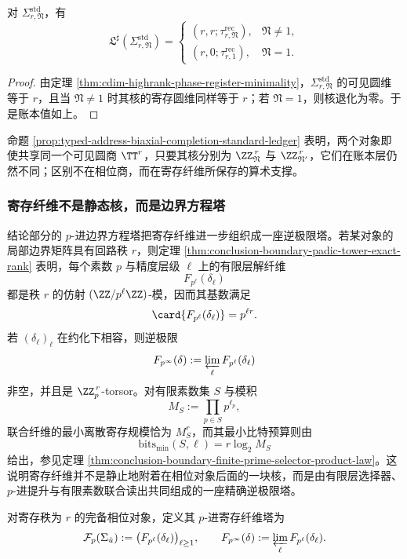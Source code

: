 \begin{proposition}[标准原型的账本值]\label{prop:typed-address-biaxial-completion-standard-ledger}
对 \(\Sigma^{\mathrm{std}}_{r,\mathfrak N}\)，有
\[
\mathfrak L^\sharp(\Sigma^{\mathrm{std}}_{r,\mathfrak N})
=
\begin{cases}
(r,r;\tau^{\mathrm{rec}}_{r,\mathfrak N}), & \mathfrak N\neq 1,\\[4pt]
(r,0;\tau^{\mathrm{rec}}_{r,1}), & \mathfrak N=1.
\end{cases}
\]
\end{proposition}
\begin{proof}
由定理 \ref{thm:cdim-highrank-phase-register-minimality}，\(\Sigma^{\mathrm{std}}_{r,\mathfrak N}\) 的可见圆维等于 \(r\)，且当 \(\mathfrak N\neq 1\) 时其核的寄存圆维同样等于 \(r\)；若 \(\mathfrak N=1\)，则核退化为零。于是账本值如上。
\end{proof}

命题 \ref{prop:typed-address-biaxial-completion-standard-ledger} 表明，两个对象即使共享同一个可见圆商 \(\TT^r\)，只要其核分别为 \(\ZZ_{\mathfrak N}^{\,r}\) 与 \(\ZZ_{\mathfrak N'}^{\,r}\)，它们在账本层仍然不同；区别不在相位商，而在寄存纤维所保存的算术支撑。

\subsubsection{寄存纤维不是静态核，而是边界方程塔}\label{subsubsec:typed-address-biaxial-completion-register-tower}
结论部分的 \(p\)-进边界方程塔把寄存纤维进一步组织成一座逆极限塔。若某对象的局部边界矩阵具有回路秩 \(r\)，则定理 \ref{thm:conclusion-boundary-padic-tower-exact-rank} 表明，每个素数 \(p\) 与精度层级 \(\ell\) 上的有限层解纤维
\[
F_{p^\ell}(\delta_\ell)
\]
都是秩 \(r\) 的仿射 \((\ZZ/p^\ell\ZZ)\)-模，因而其基数满足
\[
\card{F_{p^\ell}(\delta_\ell)}=p^{\ell r}.
\]
若 \((\delta_\ell)_\ell\) 在约化下相容，则逆极限
\[
F_{p^\infty}(\delta):=\varprojlim_\ell F_{p^\ell}(\delta_\ell)
\]
非空，并且是 \(\ZZ_p^{\,r}\)-torsor。对有限素数集 \(S\) 与模积
\[
M_S:=\prod_{p\in S}p^{\ell_p},
\]
联合纤维的最小离散寄存规模恰为 \(M_S^r\)，而其最小比特预算则由
\[
\mathrm{bits}_{\min}(S,\boldsymbol\ell)=r\log_2 M_S
\]
给出，参见定理 \ref{thm:conclusion-boundary-finite-prime-selector-product-law}。这说明寄存纤维并不是静止地附着在相位对象后面的一块核，而是由有限层选择器、\(p\)-进提升与有限素数联合读出共同组成的一座精确逆极限塔。

\begin{definition}[寄存纤维塔]\label{def:typed-address-biaxial-completion-register-fiber-tower}
对寄存秩为 \(r\) 的完备相位对象，定义其 \(p\)-进寄存纤维塔为
\[
\mathcal F_p(\Sigma_{\hat u})
:=
\bigl(F_{p^\ell}(\delta_\ell)\bigr)_{\ell\ge 1},
\qquad
F_{p^\infty}(\delta):=\varprojlim_\ell F_{p^\ell}(\delta_\ell).
\]
\end{definition}

